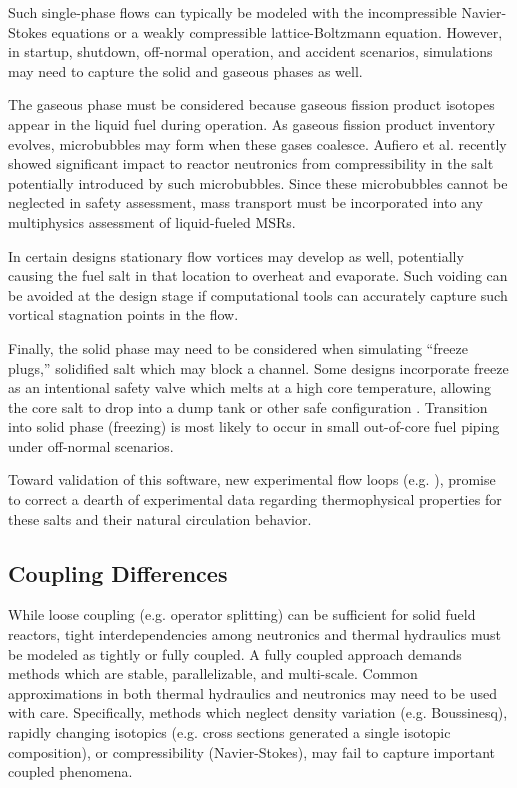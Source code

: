 Such single-phase flows can typically be modeled with the incompressible 
Navier-Stokes equations or a weakly compressible lattice-Boltzmann equation.  
However, in  startup, shutdown, off-normal operation, 
and accident scenarios, simulations may need to capture the solid and gaseous 
phases as well.

The gaseous phase must be considered because gaseous fission product isotopes 
appear in the liquid fuel during operation. As gaseous fission product 
inventory evolves, microbubbles may form when these gases coalesce. Aufiero et 
al. \cite{aufiero_monte_2017} recently showed significant impact to reactor 
neutronics from compressibility in the salt potentially introduced by such 
microbubbles. Since these microbubbles cannot be neglected in safety 
assessment, mass transport must be incorporated into any multiphysics 
assessment of liquid-fueled \glspl{MSR}.

In certain designs stationary flow vortices may develop as well, potentially 
causing the fuel salt in that location to overheat and evaporate. Such voiding 
can be avoided at the design stage if computational tools can accurately 
capture such vortical stagnation points in the flow. 

Finally, the solid phase may need to be considered when simulating ``freeze plugs,'' 
solidified salt which may block a channel. Some designs incorporate freeze as 
an intentional safety valve which melts at a high core temperature, allowing 
the core salt to drop into a dump tank or other safe configuration 
\cite{li_preliminary_2014}.  Transition into solid phase (freezing) is most 
likely to occur in small out-of-core fuel piping under off-normal scenarios. 

Toward validation of this software, new experimental flow loops (e.g.  
\cite{britsch_natural_2019}), promise to correct a dearth of experimental data 
regarding thermophysical properties for these salts and their natural 
circulation behavior.  

\subsection{Coupling Differences}

While loose coupling (e.g. operator splitting) can be sufficient for solid 
fueld reactors, tight interdependencies among neutronics and thermal 
hydraulics must be modeled as tightly or fully coupled. A fully coupled 
approach demands methods which are stable, parallelizable, and multi-scale. Common 
approximations in both thermal hydraulics and neutronics may need to be used 
with care. Specifically, methods which
neglect density variation (e.g. Boussinesq), rapidly changing isotopics (e.g. 
cross sections generated a single isotopic composition), or compressibility 
(Navier-Stokes), may fail to capture important coupled phenomena.

